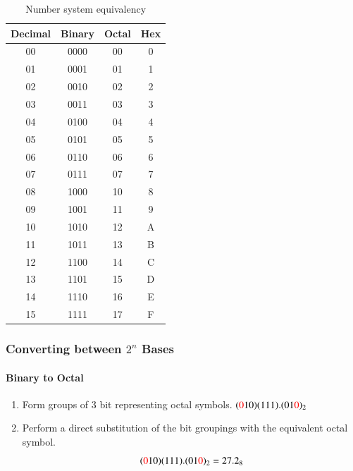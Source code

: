 \documentclass[a4paper]{article}
\begin{document}
\begin{table}[H]
\centering
\begin{tabular}{c|c|c|c}
\textbf{Decimal} & \textbf{Binary} & \textbf{Octal} & \textbf{Hex} \\ \hline
00 & 0000 & 00 & 0\\
01 & 0001 & 01 & 1 \\
02               & 0010            & 02             & 2            \\
03               & 0011            & 03             & 3            \\ \hline
04               & 0100            & 04             & 4            \\
05               & 0101            & 05             & 5            \\
06               & 0110            & 06             & 6            \\
07               & 0111            & 07             & 7            \\ \hline
08               & 1000            & 10             & 8            \\
09               & 1001            & 11             & 9            \\
10               & 1010            & 12             & A            \\
11               & 1011            & 13             & B            \\ \hline
12               & 1100            & 14             & C            \\
13               & 1101            & 15             & D            \\
14               & 1110            & 16             & E            \\
15               & 1111            & 17             & F           
\end{tabular}
\caption{Number system equivalency}
\end{table}

\subsubsection{Converting between \texorpdfstring{$2^n$}{2n} Bases}

\paragraph{Binary to Octal}
\begin{enumerate}
    \item Form groups of 3 bit representing octal symbols.\quad 
    $(\textcolor{red}{0}10)(111).(01\textcolor{red}{0})_2$
    \item Perform a direct substitution of the bit groupings with the equivalent octal symbol.
    $$(\textcolor{red}{0}10)(111).(01\textcolor{red}{0})_2 = 27.2_8$$
\end{enumerate}
\end{document}
